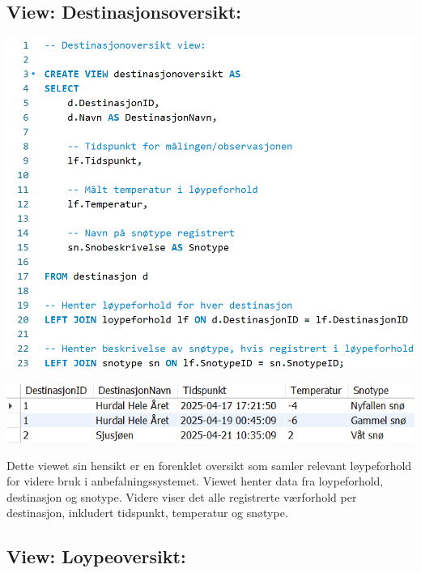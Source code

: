 \documentclass[10pt, a4paper]{article}
\begin{document}
\subsection{View: Destinasjonsoversikt:}

\includegraphics[width=\textwidth]{destinasjonoversikt.png}

\includegraphics[width=\textwidth]{destinasjonoversikt_resultat.png}

Dette viewet sin hensikt er en forenklet oversikt som samler relevant løypeforhold for videre bruk i anbefalningssystemet. Viewet henter data fra loypeforhold, destinasjon og snotype. Videre viser det alle registrerte værforhold per destinasjon, inkludert tidspunkt, temperatur og snøtype. 

\subsection{View: Loypeoversikt:}
\end{document}
